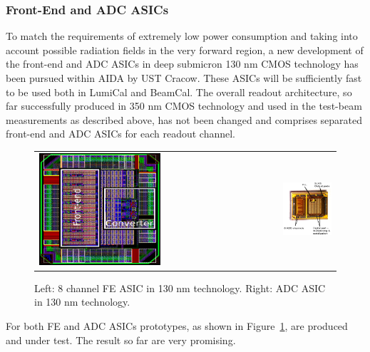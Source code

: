 \subsubsection{Front-End and ADC ASICs}



To match the requirements of extremely low power consumption and taking into account possible radiation
fields in the very forward region, a new development of the front-end and ADC ASICs in deep submicron
130 nm CMOS technology has been
pursued within AIDA by UST Cracow.
These ASICs will be sufficiently fast to be used both in LumiCal and BeamCal.
The overall readout architecture, so far successfully produced in 350 nm CMOS technology and used in the test-beam
measurements as described above, has not been changed and comprises separated front-end
and ADC ASICs for each readout channel.
\begin{figure}[hbp]
\begin{center}
 \begin{tabular}{rrr}
    \includegraphics[width=0.4\columnwidth]{Calorimeter/FCAL/figs/FE_ASIC.png}
     &~~~~~~&
 \includegraphics[width=0.4\textwidth]{Calorimeter/FCAL/figs/ADC_ASIC_2.png} \\

\end{tabular}
   \end{center}
          \caption{Left: 8 channel FE ASIC in 130 nm technology.
               Right: ADC ASIC in 130 nm technology.}
    \label{fig:ASIC_ADC}
\end{figure}
For both FE and ADC ASICs prototypes, as shown in Figure~\ref{fig:ASIC_ADC}, are produced and under test.
The result so far are very promising.


